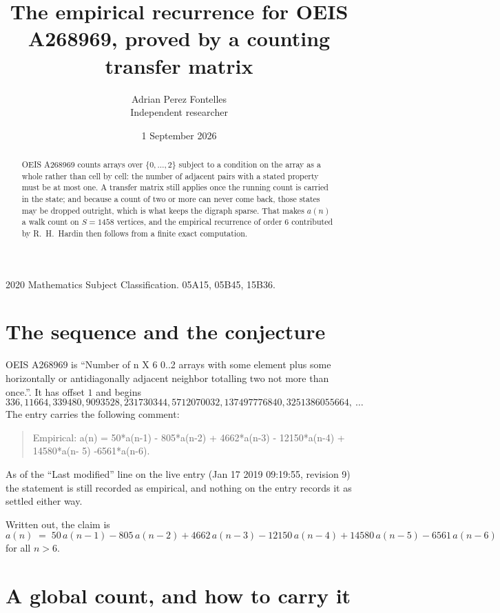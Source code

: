 \documentclass[11pt,a4paper]{article}
\title{The empirical recurrence for OEIS A268969, proved by a counting transfer matrix}
\author{Adrian Perez Fontelles\\ \small Independent researcher}
\date{1 September 2026}
\theoremstyle{plain}
\theoremstyle{definition}
\begin{document}
\maketitle

\begin{abstract}
OEIS A268969 counts arrays over $\{0,\dots,2\}$ subject to a condition on the array as a
whole rather than cell by cell: the number of adjacent pairs with a stated property must be
at most one. A transfer matrix still applies once the running count is carried in the state; and
because a count of two or more can never come back, those states may be dropped outright,
which is what keeps the digraph sparse. That makes $a(n)$ a walk count on $S=1458$ vertices,
and the empirical recurrence of order $6$ contributed by R.~H.~Hardin then follows from
a finite exact computation.
\end{abstract}

\noindent\small 2020 Mathematics Subject Classification. 05A15, 05B45, 15B36.\normalsize

\section{The sequence and the conjecture}

OEIS A268969 is ``Number of n X 6 0..2 arrays with some element plus some horizontally or antidiagonally adjacent neighbor totalling two not more than once.''. It has offset $1$ and begins
\[
336, 11664, 339480, 9093528, 231730344, 5712070032, 137497776840, 3251386055664,\ \dots
\]
The entry carries the following comment:
\begin{quote}\small
Empirical: a(n) = 50*a(n-1) - 805*a(n-2) + 4662*a(n-3) - 12150*a(n-4) + 14580*a(n- 5) -6561*a(n-6).
\end{quote}
As of the ``Last modified'' line on the live entry (Jan 17 2019 09:19:55, revision 9) the statement is
still recorded as empirical, and nothing on the entry records it as settled either way.

Written out, the claim is
\begin{equation}\label{eq:conj}
a(n)\;=\;50\,a(n-1) - 805\,a(n-2) + 4662\,a(n-3) - 12150\,a(n-4) + 14580\,a(n-5) - 6561\,a(n-6)
\end{equation}
for all $n>6$.

\section{A global count, and how to carry it}
\end{document}
